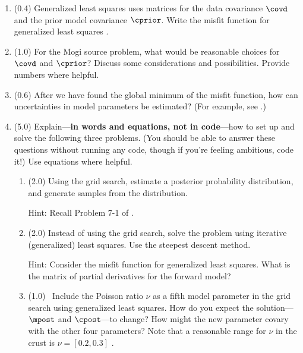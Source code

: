 \documentclass[11pt,titlepage,fleqn]{article}
\begin{document}
\begin{enumerate}
\item (0.4) Generalized least squares uses matrices for the data covariance $\covd$ and the prior model covariance $\cprior$. Write the misfit function for generalized least squares \citep{Tarantola2005}.

\item (1.0)
For the Mogi source problem, what would be reasonable choices for $\covd$ and $\cprior$? Discuss some considerations and possibilities. Provide numbers where helpful.

\item (0.6) After we have found the global minimum of the misfit function, how can uncertainties in model parameters be estimated? (For example, see \citet{Wright2003}.)


\item (5.0) Explain---{\bf in words and equations, not in code}---how to set up and solve the following three problems.
(You should be able to answer these questions without running any code, though if you're feeling ambitious, code it!) Use equations where helpful.

\begin{enumerate}
\item (2.0) Using the grid search, estimate a posterior probability distribution, and generate samples from the distribution.

Hint: Recall Problem 7-1 of \citet{Tarantola2005}.

\item (2.0) Instead of using the grid search, solve the problem using iterative (generalized) least squares. Use the steepest descent method.

Hint: Consider the misfit function for generalized least squares. What is the matrix of partial derivatives for the forward model?

\item (1.0) \ptag\ Include the Poisson ratio $\nu$ as a fifth model parameter in the grid search using generalized least squares. How do you expect the solution---$\mpost$ and $\cpost$---to change? How might the new parameter covary with the other four parameters? Note that a reasonable range for $\nu$ in the crust is $\nu = [0.2,0.3]$ \citep{ChristensenMooney1995}.

\end{enumerate}

\end{enumerate}



\end{document}
